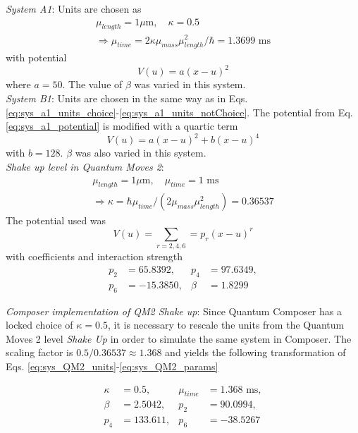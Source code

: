 \documentclass[a4paper, twocolumn]{revtex4-1}
\begin{document}
\textit{System A1}: Units are chosen as
\begin{subequations}
	\begin{gather}
		\mu_{length} = 1 \mu\text{m}, \quad \kappa = 0.5 \label{eq:sys_a1_units_choice}\\
		\Rightarrow \mu_{time} = 2\kappa \mu_{mass}\mu^2_{length} / \hbar = 1.3699\text{ ms} \label{eq:sys_a1_units_notChoice}
	\end{gather}
\end{subequations}
with potential 
\begin{equation}
	V(u) = a(x-u)^2
	\label{eq:sys_a1_potential}
\end{equation}
where $a = 50$. The value of $\beta$ was varied in this system. \\

\textit{System B1}: Units are chosen in the same way as in Eqs. \eqref{eq:sys_a1_units_choice}-\eqref{eq:sys_a1_units_notChoice}. The potential from Eq. \eqref{eq:sys_a1_potential} is modified with a quartic term
\begin{equation}
	V(u) = a(x-u)^2 + b(x-u)^4
	\label{eq:sys_b1_potential}
\end{equation} 
with $b = 128$. $\beta$ was also varied in this system. \\
\textit{Shake up level in Quantum Moves 2}\cite{QM2Paper}:
\begin{subequations}\label{eq:sys_QM2_units}
	\begin{gather}
		\mu_{length} = 1 \mu\text{m}, \quad \mu_{time} = 1\text{ ms} \label{eq:sys_QM2_units_choice}\\
		\Rightarrow \kappa = \hbar \mu_{time} / (2 \mu_{mass} \mu^2_{length}) = 0.36537 \label{eq:sys_QM2_units_notChoice}
	\end{gather}
\end{subequations}
The potential used was
\begin{equation}
	V(u) = \sum\limits_{r = 2,4,6} = p_r (x - u)^r
	\label{eq:sys_QM2_potential}
\end{equation} 
with coefficients and interaction strength
\begin{subequations}\label{eq:sys_QM2_params}
	\begin{align}
		p_2& = 65.8392,& p_4& = 97.6349, \\
		p_6& = -15.3850,& \beta& = 1.8299
	\end{align}
\end{subequations}

\textit{Composer implementation of QM2 Shake up}:
Since Quantum Composer has a locked choice of $\kappa = 0.5$, it is necessary to rescale the units from the Quantum Moves 2 level \textit{Shake Up} in order to simulate the same system in Composer. The scaling factor is $0.5/0.36537 \approx 1.368$ and yields the following transformation of Eqs. \eqref{eq:sys_QM2_units}-\eqref{eq:sys_QM2_params}

\begin{subequations} \label{eq:sys_compQM2_params}
	\begin{align}
		\kappa& = 0.5,& \mu_{time}& =1.368\text{ ms}, \\
		\beta& = 2.5042,& p_2& = 90.0994, \\
		p_4& = 133.611,& p_6 &= -38.5267
	\end{align}
\end{subequations}
\end{document}
